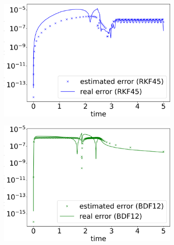 \documentclass{report}
\begin{document}
\begin{figure}[H]
    \centering
    \begin{subfigure}{0.32\textwidth}
    	\centering
    	\includegraphics[width=1\textwidth]{images/errorEstimateRKF45.png}
        \label{fig:errorEstimateEvolutionRKF45}
    \end{subfigure}
    \begin{subfigure}{0.32\textwidth}
    	\centering
    	\includegraphics[width=1\textwidth]{images/errorEstimateBDF12.png}
        \label{fig:errorEstimateEvolutionBDF12}
    \end{subfigure}
    \begin{subfigure}{0.32\textwidth}
    	\centering

\end{subfigure}
\end{figure}
\end{document}
